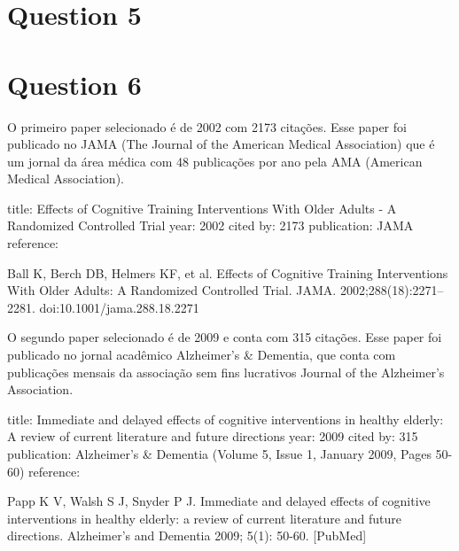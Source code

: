 \documentclass[a4paper]{article}    %
\begin{document}
\newpage
 
\section*{Question 5}

\newpage

\section*{Question 6}

O primeiro paper selecionado é de 2002 com 2173 citações. Esse paper foi publicado no JAMA (The Journal of the American Medical Association) que é um jornal da área médica com 48 publicações por ano pela AMA (American Medical Association).

title: Effects of Cognitive Training Interventions With Older Adults - A Randomized Controlled Trial
year: 2002
cited by: 2173
publication: JAMA
reference:

Ball K, Berch DB, Helmers KF, et al. Effects of Cognitive Training Interventions With Older Adults: A Randomized Controlled Trial. JAMA. 2002;288(18):2271–2281. doi:10.1001/jama.288.18.2271


O segundo paper selecionado é de 2009 e conta com 315 citações. Esse paper foi publicado no jornal acadêmico Alzheimer's \& Dementia, que conta com publicações mensais da associação sem fins lucrativos Journal of the Alzheimer's Association.

title: Immediate and delayed effects of cognitive interventions in healthy elderly: A review of current literature and future directions
year: 2009
cited by: 315
publication: Alzheimer's \& Dementia (Volume 5, Issue 1, January 2009, Pages 50-60)
reference:

Papp K V, Walsh S J, Snyder P J. Immediate and delayed effects of cognitive interventions in healthy elderly: a review of current literature and future directions. Alzheimer's and Dementia 2009; 5(1): 50-60. [PubMed]

\end{document}
